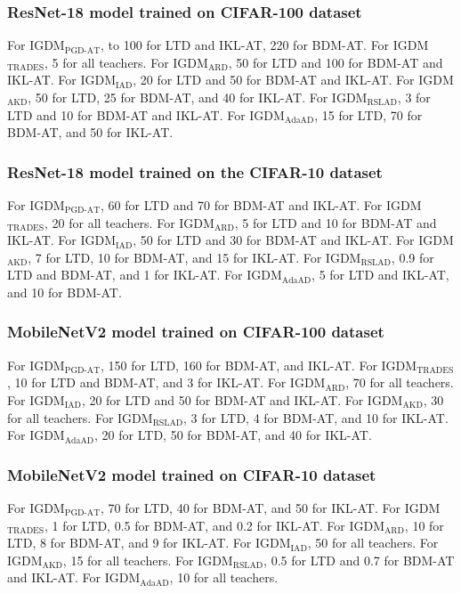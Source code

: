 \documentclass{article} %
\begin{document}
\subsubsection{ResNet-18 model trained on CIFAR-100 dataset}
For IGDM$_{\text{PGD-AT}}$, to 100 for LTD and IKL-AT, 220 for BDM-AT.
For IGDM$_{\text{TRADES}}$, 5 for all teachers.
For IGDM$_{\text{ARD}}$, 50 for LTD and 100 for BDM-AT and IKL-AT.
For IGDM$_{\text{IAD}}$, 20 for LTD and 50 for BDM-AT and IKL-AT.
For IGDM$_{\text{AKD}}$, 50 for LTD, 25 for BDM-AT, and 40 for IKL-AT.
For IGDM$_{\text{RSLAD}}$, 3 for LTD and 10 for BDM-AT and IKL-AT.
For IGDM$_{\text{AdaAD}}$, 15 for LTD, 70 for BDM-AT, and 50 for IKL-AT.

\subsubsection{ResNet-18 model trained on the CIFAR-10 dataset}
For IGDM$_{\text{PGD-AT}}$, 60 for LTD and 70 for BDM-AT and IKL-AT.
For IGDM$_{\text{TRADES}}$, 20 for all teachers.
For IGDM$_{\text{ARD}}$, 5 for LTD and 10 for BDM-AT and IKL-AT.
For IGDM$_{\text{IAD}}$, 50 for LTD and 30 for BDM-AT and IKL-AT.
For IGDM$_{\text{AKD}}$, 7 for LTD, 10 for BDM-AT, and 15 for IKL-AT.
For IGDM$_{\text{RSLAD}}$, 0.9 for LTD and BDM-AT, and 1 for IKL-AT.
For IGDM$_{\text{AdaAD}}$, 5 for LTD and IKL-AT, and 10 for BDM-AT.

\subsubsection{MobileNetV2 model trained on CIFAR-100 dataset}
For IGDM$_{\text{PGD-AT}}$, 150 for LTD, 160 for BDM-AT, and IKL-AT.
For IGDM$_{\text{TRADES}}$, 10 for LTD and BDM-AT, and 3 for IKL-AT.
For IGDM$_{\text{ARD}}$, 70 for all teachers.
For IGDM$_{\text{IAD}}$, 20 for LTD and 50 for BDM-AT and IKL-AT.
For IGDM$_{\text{AKD}}$, 30 for all teachers.
For IGDM$_{\text{RSLAD}}$, 3 for LTD, 4 for BDM-AT, and 10 for IKL-AT.
For IGDM$_{\text{AdaAD}}$, 20 for LTD, 50 for BDM-AT, and 40 for IKL-AT.

\subsubsection{MobileNetV2 model trained on CIFAR-10 dataset}
For IGDM$_{\text{PGD-AT}}$, 70 for LTD, 40 for BDM-AT, and 50 for IKL-AT.
For IGDM$_{\text{TRADES}}$, 1 for LTD, 0.5 for BDM-AT, and 0.2 for IKL-AT.
For IGDM$_{\text{ARD}}$, 10 for LTD, 8 for BDM-AT, and 9 for IKL-AT.
For IGDM$_{\text{IAD}}$, 50 for all teachers.
For IGDM$_{\text{AKD}}$, 15 for all teachers.
For IGDM$_{\text{RSLAD}}$, 0.5 for LTD and 0.7 for BDM-AT and IKL-AT.
For IGDM$_{\text{AdaAD}}$, 10 for all teachers.
\end{document}

